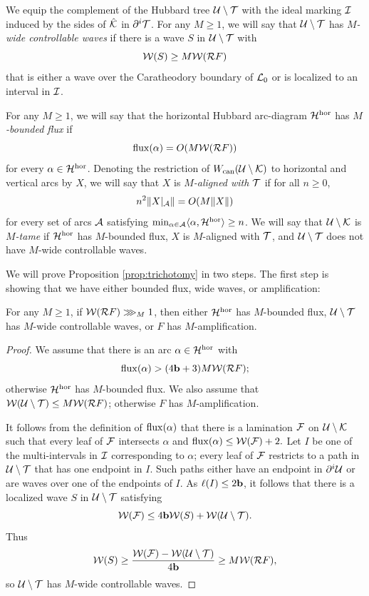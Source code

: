 \documentclass[12pt]{amsart}
\begin{document}
We equip the complement of the Hubbard tree $\UU\sm \TT$ with the ideal marking $\II$ induced by the sides of $\hat\KK$ in $\ddi \TT$. For any $M\geq 1$, we will say that $\UU\sm \TT$ has \emph{$M$-wide controllable waves} if there is a wave $S$ in $\UU\sm \TT$
with 
$$\WW(S)\geq M \WW(\RR F)$$
that is either a wave over the Caratheodory boundary of $\LL_0$ 
or is localized to an interval in $\II$.

For any $M\geq 1$, we will say that the horizontal Hubbard arc-diagram $\HH^\hor$ has  \textit{$M$-bounded flux}  if 
$$\flux(\alpha)= O( M \WW(\RR F))$$
for every $\alpha\in \HH^\hor$.
Denoting the restriction of $\wcan(\UU\sm \KK)$ to horizontal and vertical arcs by $X$, we will say that $X$ is \textit{$M$-aligned with $\TT$} if for all $n\geq 0$, 
$$n^2\|X|_\AA\|= O(M \|X\|)$$
for every set of arcs $\AA$ satisfying $\min_{\alpha\in \AA}\langle \alpha, \HH^\hor\rangle \geq n$.
We will say that $\UU \sm \KK$ is \textit{$M$-tame}  if $\HH^\hor$ has $M$-bounded flux, $X$ is $M$-aligned with $\TT$, and $\UU\sm \TT$ does not have $M$-wide controllable waves.


We will prove Proposition \ref{prop:trichotomy} in two steps. The first step is showing that we have either bounded flux, wide waves, or amplification:

\begin{prop}\label{prop:bounded flux}
    For any $M\geq 1$, if $\WW(\RR F)\largegiven{M}$, then either $\HH^\hor$ has $M$-bounded flux, $\UU\sm \TT$ has $M$-wide controllable waves, or $F$ has $M$-amplification.
\end{prop}

\begin{proof}
	We assume that there is an arc $\alpha\in \HH^\hor$ with 
	$$
	\flux(\alpha)> (4\bound +3)M\WW(\RR F);
	$$
	otherwise $\HH^\hor$ has $M$-bounded flux.
	We also assume that $\WW(\UU\sm \TT)\leq M \WW(\RR F)$; otherwise $F$ has $M$-amplification.
	
	
	It follows from the definition of $\flux(\alpha)$ that there is a lamination $\FF$ on $\UU\sm \KK$ such that every leaf of $\FF$ intersects $\alpha$ and $\flux(\alpha)\leq \WW(\FF)+2.$
	Let $I$ be one of the multi-intervals in $\II$ corresponding to $\alpha$; every leaf of $\FF$ restricts to a path in $\UU\sm \TT$ that has one endpoint in $I$. Such paths either have an endpoint in $\ddi \UU$ or are waves over one of the endpoints of $I$. As $\ell(I)\leq 2\bound$, it follows that there is a localized wave $S$ in $\UU\sm \TT$ satisfying
	$$\WW(\FF)\leq 4\bound \WW(S)+ \WW(\UU\sm \TT).$$
	Thus
	$$
	\WW(S)\geq \frac{\WW(\FF)- \WW(\UU\sm \TT)}{4\bound}\geq M\WW(\RR F),
	$$
	so $\UU\sm \TT$ has $M$-wide controllable waves.
\end{proof}
\end{document}

